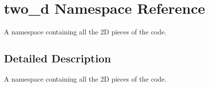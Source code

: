 \hypertarget{namespacetwo__d}{\section{two\-\_\-d Namespace Reference}
\label{namespacetwo__d}
}


A namespace containing all the 2\-D pieces of the code.  




\subsection{Detailed Description}
A namespace containing all the 2\-D pieces of the code. 

 